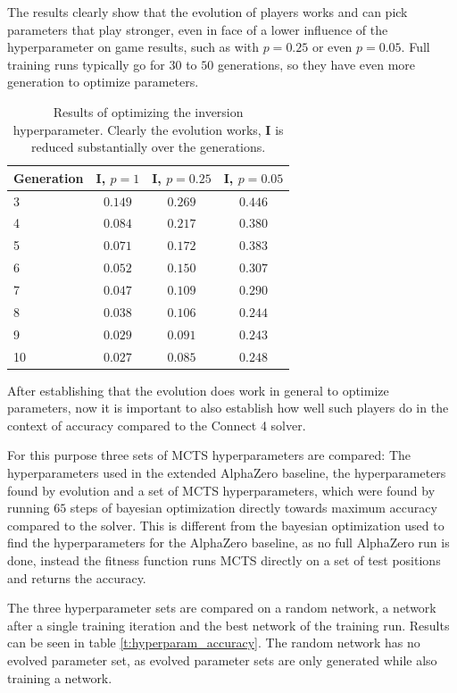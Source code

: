 \documentclass[12pt,onecolumn,oneside,titlepage]{article}
\begin{document}
The results clearly show that the evolution of players works and can pick parameters that play stronger, even in face of a lower influence of the hyperparameter on game results, such as with $p = 0.25$ or even $p = 0.05$.
Full training runs typically go for $30$ to $50$ generations, so they have even more generation to optimize parameters.

\begin{table} [H]
 \centering
  \begin{tabular}{ l | c c c }
  Generation & $\mathbf{I}$, $p = 1$ & $\mathbf{I}$, $p = 0.25$ & $\mathbf{I}$, $p = 0.05$ \\
  \hline
  3 & $0.149$ & $0.269$ & $0.446$ \\
  4 & $0.084$ & $0.217$ & $0.380$ \\
  5 & $0.071$ & $0.172$ & $0.383$ \\
  6 & $0.052$ & $0.150$ & $0.307$ \\
  7 & $0.047$ & $0.109$ & $0.290$ \\
  8 & $0.038$ & $0.106$ & $0.244$ \\
  9 & $0.029$ & $0.091$ & $0.243$ \\
  10 & $0.027$ & $0.085$ & $0.248$ \\
  \end{tabular}
  \caption{Results of optimizing the inversion hyperparameter. Clearly the evolution works, $\mathbf{I}$ is reduced substantially over the generations.}
  \label{t:inversion_results}
\end{table}


After establishing that the evolution does work in general to optimize parameters, now it is important to also establish how well such players do in the context of accuracy compared to the Connect 4 solver.

For this purpose three sets of MCTS hyperparameters are compared: The hyperparameters used in the extended AlphaZero baseline, the hyperparameters found by evolution and a set of MCTS hyperparameters, which were found by running $65$ steps of bayesian optimization
directly towards maximum accuracy compared to the solver. This is different from the bayesian optimization used to find the hyperparameters for the AlphaZero baseline, as no full AlphaZero run is done, instead the fitness function runs MCTS directly on a set of test positions and returns
the accuracy.

The three hyperparameter sets are compared on a random network, a network after a single training iteration and the best network of the training run. Results can be seen in table \ref{t:hyperparam_accuracy}. The random network has no evolved
parameter set, as evolved parameter sets are only generated while also training a network.
\end{document}
